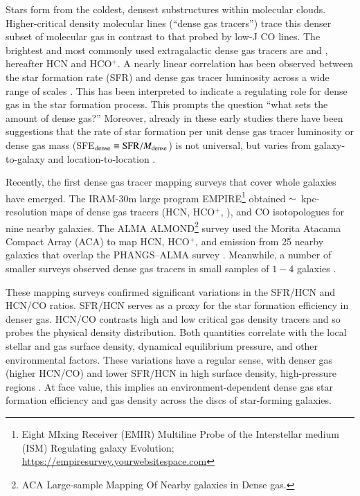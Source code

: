 \documentclass[letter, longauth]{aa} %
\begin{document}
Stars form from the coldest, densest substructures within molecular clouds. 
Higher-critical density molecular lines (``dense gas tracers'') trace this denser subset of molecular gas in contrast to that probed by low-J CO lines.
The brightest and most commonly used extragalactic dense gas tracers are \hcnone and \hcopone, hereafter HCN and HCO$^+$. A nearly linear correlation has been observed between the star formation rate (SFR) and dense gas tracer luminosity across a wide range of scales \citep[e.g.,][]{Gao2004, Wu2010, Garcia-Burillo2012, Usero2015, Chen2017}. This has been interpreted to indicate a regulating role for dense gas in the star formation process. This prompts the question ``what sets the amount of dense gas?'' Moreover, already in these early studies there have been suggestions that the rate of star formation per unit dense gas tracer luminosity or dense gas mass (SFE$_{\rm dense} \equiv {\rm SFR}/M_{\rm dense}$) is not universal, but varies from galaxy-to-galaxy and location-to-location \citep[][]{Garcia-Burillo2012, Usero2015, Chen2015}.

Recently, the first dense gas tracer mapping surveys that cover whole galaxies have emerged. The IRAM-30m large program EMPIRE\footnote{Eight MIxing Receiver (EMIR) Multiline Probe of the Interstellar medium (ISM) Regulating galaxy Evolution; \url{https://empiresurvey.yourwebsitespace.com}} \citep[][]{Bigiel2016, Jimenez-Donaire2017, Jimenez-Donaire2019} obtained $\sim$~kpc-resolution maps of dense gas tracers (HCN, HCO$^+$, \hncone), and CO isotopologues for nine nearby galaxies. The ALMA ALMOND\footnote{ACA Large-sample Mapping Of Nearby galaxies in Dense gas.} survey \citep{Neumann2023a} used the Morita Atacama Compact Array (ACA) to map HCN, HCO$^+$, and \cstwo emission from 25 nearby galaxies that overlap the PHANGS--ALMA  \cotwo survey \citep{Leroy2021a}. 
Meanwhile, a number of smaller surveys observed dense gas tracers in small samples of $1{-}4$ galaxies \citep[e.g.][]{Tan2018, Gallagher2018a, Gallagher2018b, Querejeta2019, Beslic2021, Heyer2022, Neumann2024, Lin2024}. 

These mapping surveys confirmed significant variations in the SFR/HCN and HCN/CO ratios.
SFR/HCN serves as a proxy for the star formation efficiency in denser gas.
HCN/CO contrasts high and low critical gas density tracers and so probes the physical density distribution. 
Both quantities correlate with the local stellar and gas surface density, dynamical equilibrium pressure, and other environmental factors. 
These variations have a regular sense, with denser gas (higher HCN/CO) and lower SFR/HCN in high surface density, high-pressure regions \citep[e.g.][]{Jimenez-Donaire2019}.  
At face value, this implies an environment-dependent dense gas star formation efficiency and gas density across the discs of star-forming galaxies.
\end{document}
